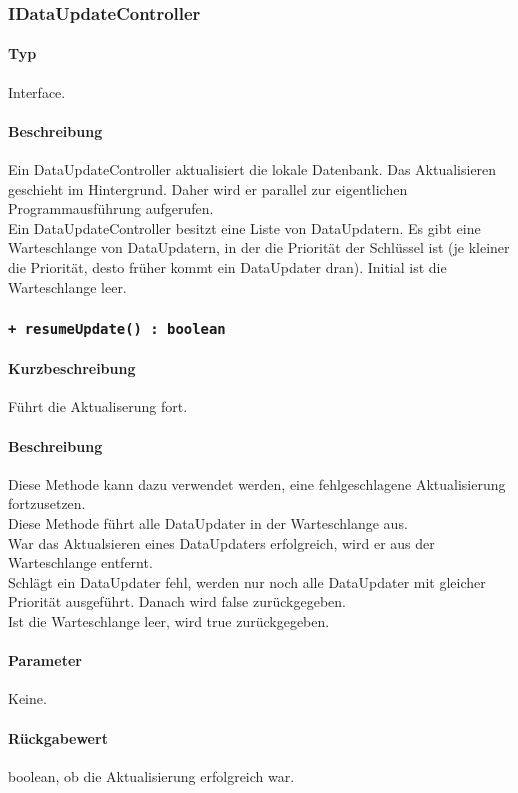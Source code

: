 \subsubsection{IDataUpdateController}
\paragraph*{Typ}
Interface.
\paragraph*{Beschreibung}
Ein DataUpdateController aktualisiert die lokale Datenbank. Das Aktualisieren geschieht im 
Hintergrund. Daher wird er parallel zur eigentlichen Programmausführung aufgerufen.\\
Ein DataUpdateController besitzt eine Liste von DataUpdatern.
Es gibt eine Warteschlange von DataUpdatern, in der die Priorität der Schlüssel ist (je kleiner 
die Priorität, desto früher kommt ein DataUpdater dran). Initial ist die Warteschlange leer.\\


\subsubsection*{\texttt{+ resumeUpdate() : boolean}}%
\paragraph*{Kurzbeschreibung}
Führt die Aktualiserung fort.
\paragraph*{Beschreibung}
Diese Methode kann dazu verwendet werden, eine fehlgeschlagene Aktualisierung fortzusetzen.\\
Diese Methode führt alle DataUpdater in der Warteschlange aus.\\
War das Aktualsieren eines DataUpdaters erfolgreich, wird er aus der Warteschlange entfernt.\\
Schlägt ein DataUpdater fehl, werden nur noch alle DataUpdater mit gleicher Priorität 
ausgeführt. Danach wird false zurückgegeben.\\
Ist die Warteschlange leer, wird true zurückgegeben.\\
\paragraph*{Parameter}
Keine.
\paragraph*{Rückgabewert}
boolean, ob die Aktualisierung erfolgreich war.

